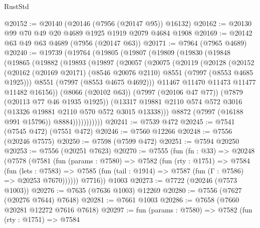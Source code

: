 \begin{lexlean}{RustStd}
\begin{coremodule}
@20152 := @20140 (@20146 (@7956 (@20147 @95)) @16132)
@20162 := @20130 @99 @70 @49 @20 @4689 @1925 @1919 @2079 @4684 @1908
@20169 := @20142 @63 @49 @63 @4689 (@7956 (@20147 @63))
@20171 := @7964 (@7965 @4689)
@20240 := @19739
    (@19764
      (@19805
        (@19807
          (@19809
            (@19830
              (@19848
                (@19865
                  (@19882
                    (@19893
                      (@19897
                        (@20057
                          (@20075
                            (@20119
                              (@20128
                                (@20152
                                  (@20162
                                    (@20169 @20171)
                                    (@8546 @20076 @2110)
                                    @8551
                                    (@7997 (@8553 @4685 @1925)))
                                  @8551
                                  (@7997 (@8553 @4675 @4692)))
                                @11467
                                @11470
                                @11473
                                @11477
                                @11482
                                @16156))
                            (@8066 (@20102 @63))
                            (@7997 (@20106 @47 @77))
                            (@7879 (@20113 @77 @46 @1935 @1925))
                            (@13317
                              @19881
                              @2110
                              @574
                              @572
                              @3016
                              (@13326 @19881 @2110 @570 @572 @3015 @13338)))
                          @8872
                          (@7997 (@16188 @991 @15796))
                          @8884)))))))))))
@20241 := @7539 @472
@20245 := @7541 (@7545 @472) (@7551 @472)
@20246 := @7560 @12266
@20248 := @7556 (@20246 @7575)
@20250 := @7598 (@7599 @472)
@20251 := @7594 @20250
@20253 := @7556 (@20251 @7623)
@20270 := @7555
    (fun (fn : @33) =>
    @20248
      (@7578
        (@7581
          (fun (params : @7580) =>
          @7582
            (fun (rty : @1751) =>
            @7584
              (fun (lets : @7583) =>
              @7585 (fun (tail : @1914) => @7587 (fun (Γ : @7586) => @20253 @7670))))))
        @7716))
    @1003
@20273 := @7722 (@20246 (@7573 @1003))
@20276 := @7635 (@7636 @1003) @12269
@20280 := @7556 (@7627 (@20276 @7644) @7648)
@20281 := @7661 @1003
@20286 := @7658 (@7660 @20281 @12272 @7616 @7618)
@20297 := fun (params : @7580) =>
  @7582
    (fun (rty : @1751) =>
    @7584

\end{coremodule}
\end{lexlean}
